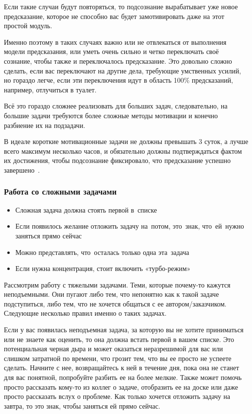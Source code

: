 \documentclass{../industrial-development}
\begin{document}
Если такие случаи будут повторяться, то подсознание вырабатывает уже новое предсказание, которое не способно вас будет замотивировать даже на этот простой модуль.

Именно поэтому в таких случаях важно или не отвлекаться от выполнения модели предсказания, или уметь очень сильно и четко переключать своё сознание, чтобы также и переключалось предсказание. Это довольно сложно сделать, если вас переключают на другие дела, требующие умственных усилий, но гораздо легче, если эти переключения идут в область 100\% предсказаний, например, отлучиться в туалет.

Всё это гораздо сложнее реализовать для больших задач, следовательно, на большие задачи требуются более сложные методы мотивации и конечно разбиение их на подзадачи.

В идеале короткие мотивационные задачи не должны превышать 3 суток, а лучше всего максимум несколько часов, и обязательно должны подтверждаться фактом их достижения, чтобы подсознание фиксировало, что предсказание успешно завершено~\cite{TasksHabr}.

\begin{frame} \frametitle{Работа со сложными задачами}
  \begin{itemize}
  \item Сложная задача должна стоять первой в~списке
  \item Если появилось желание отложить задачу на~потом, это~знак, что~ей~нужно заняться прямо сейчас
  \item Можно представлять, что~осталась только одна эта~задача
  \item Если нужна концентрация, стоит включить «турбо-режим»
  \end{itemize}
\end{frame}

\lecturenotes

Рассмотрим работу с тяжелыми задачами. Теми, которые почему-то кажутся неподъемными. Они пугают либо тем, что непонятно как к такой задаче подступиться, либо тем, что не хочется общаться с ее автором/заказчиком. Следующие несколько правил именно о таких задачах.

Если у вас появилась неподъемная задача, за которую вы не хотите приниматься или не знаете как оценить, то она должна встать первой в вашем списке. Это потенциальная черная дыра и может оказаться неразрешимой для вас или слишком затратной по времени, что грозит тем, что вы ее просто не успеете сделать. Начните с нее, возвращайтесь к ней в течение дня, пока она не станет для вас понятной, попробуйте разбить ее на более мелкие. 
Также может помочь просто рассказать кому-то из коллег о задаче, отобразить ее на доске или даже просто рассказать вслух о проблеме.
Как только хочется отложить задачу на завтра, то это знак, чтобы заняться ей прямо сейчас.
\end{document}
